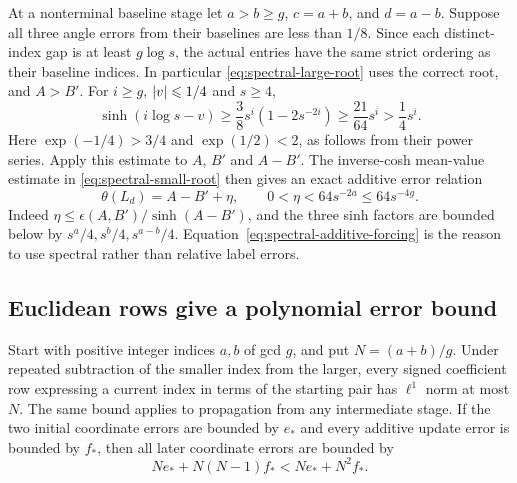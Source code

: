 At a nonterminal baseline stage let $a>b\geqslant g$,
$c=a+b$, and $d=a-b$. Suppose all three angle errors from their
baselines are less than $1/8$. Since each distinct-index gap is at
least $g\log s$, the actual entries have the same strict ordering as
their baseline indices. In particular \eqref{eq:spectral-large-root}
uses the correct root, and $A>B'$.
For $i\geqslant g$, $\lvert v\rvert\leqslant1/4$ and $s\geqslant4$,
\begin{equation}\label{eq:spectral-sinh-bound}
 \sinh(i\log s-v)
 \geqslant\frac38s^i(1-2s^{-2i})
 \geqslant\frac{21}{64}s^i>\frac14s^i.
\end{equation}
Here $\exp(-1/4)>3/4$ and $\exp(1/2)<2$, as follows from their
power series. Apply this estimate to $A$, $B'$ and $A-B'$. The
inverse-cosh mean-value estimate in \eqref{eq:spectral-small-root}
then gives an exact additive error relation
\begin{equation}\label{eq:spectral-additive-forcing}
 \theta(L_d)=A-B'+\eta,
 \qquad 0<\eta<64s^{-2a}\leqslant64s^{-4g}.
\end{equation}
Indeed $\eta\leqslant\epsilon(A,B')/\sinh(A-B')$, and the three
sinh factors are bounded below by
$s^a/4,s^b/4,s^{a-b}/4$. Equation~\eqref{eq:spectral-additive-forcing}
is the reason to use spectral rather than relative label errors.

\subsection{Euclidean rows give a polynomial error bound}

\begin{lemma}
\label{lem:euclidean-row-bound}
Start with positive integer indices $a,b$ of gcd $g$, and put
$N=(a+b)/g$. Under repeated subtraction of the smaller index from
the larger, every signed coefficient row expressing a current index
in terms of the starting pair has $\ell^1$ norm at most $N$.
The same bound applies to propagation from any intermediate stage.
If the two initial coordinate errors are bounded by $e_*$ and every
additive update error is bounded by $f_*$, then all later coordinate
errors are bounded by
\begin{equation}\label{eq:spectral-row-error-bound}
 Ne_*+N(N-1)f_*<Ne_*+N^2f_*.
\end{equation}
\end{lemma}

